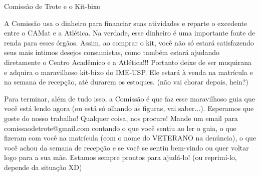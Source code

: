 \begin{secao}{Comissão de Trote e o Kit-bixo}
\begin{enumerate}
\end{enumerate}
A Comissão usa o dinheiro para financiar suas atividades e reparte o excedente
entre o CAMat e a Atlética. Na verdade, esse dinheiro é uma importante fonte de
renda para esses órgãos. Assim, ao comprar o kit, você não só estará
satisfazendo seus mais íntimos desejos consumistas, como também estará ajudando
diretamente o Centro Acadêmico e a Atlética!!! Portanto deixe de ser muquirana e
adquira o maravilhoso kit-bixo do IME-USP. Ele estará à venda na matrícula e na
semana de recepção, até durarem os estoques. (não vai chorar depois, hein?)


Para terminar, além de tudo isso, a Comissão é que faz esse maravilhoso guia que
você está lendo agora (ou está só olhando as figuras, vai saber...). Esperamos
que goste do nosso trabalho! Qualquer coisa, nos procure! Mande um email para
comissaodetrote@gmail.com contando o que você sentiu ao ler o guia, o que
fizeram com você na matrícula (com o nome do VETERANO na denúncia), o que você
achou da semana de recepção e se você se sentiu bem-vindo ou quer voltar logo
para a sua mãe. Estamos sempre prontos para ajudá-lo! (ou reprimí-lo, depende
da situação XD)

\end{secao}
